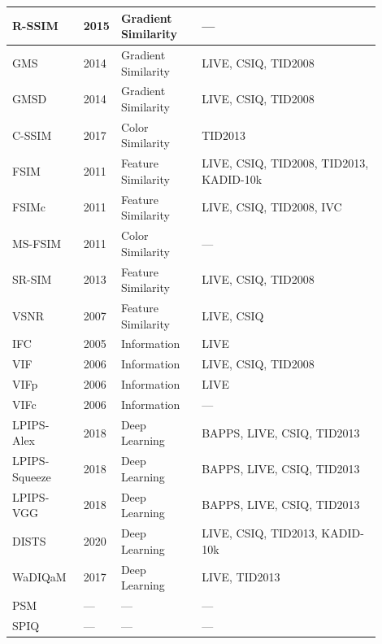 \begin{longtable}{
p{0.13\linewidth}  %
p{0.05\linewidth}  %
p{0.22\linewidth}  %
p{0.50\linewidth}  %
}
    R-SSIM~\cite{yan2015rssim} & 2015 & Gradient Similarity & --- \\ \hline
    GMS~\cite{xue2014gmsd} & 2014 & Gradient Similarity & LIVE, CSIQ, TID2008 \\ \hline
    GMSD~\cite{xue2014gmsd} & 2014 & Gradient Similarity & LIVE, CSIQ, TID2008 \\ \hline
    C-SSIM~\cite{hassan2017cssim} & 2017 & Color Similarity & TID2013 \\ \hline
    FSIM~\cite{zhang2011fsim} & 2011 & Feature Similarity & LIVE, CSIQ, TID2008, TID2013, KADID-10k \\ \hline
    FSIMc~\cite{zhang2011fsim} & 2011 & Feature Similarity & LIVE, CSIQ, TID2008, IVC \\ \hline
    MS-FSIM~\cite{zhang2011fsim} & 2011 & Color Similarity & --- \\ \hline
    SR-SIM~\cite{zhang2012srsim} & 2013 & Feature Similarity & LIVE, CSIQ, TID2008 \\ \hline
    VSNR~\cite{chandler2007vsnr} & 2007 & Feature Similarity & LIVE, CSIQ \\ \hline
    IFC~\cite{sheikh2005ifc} & 2005 & Information & LIVE \\ \hline
    VIF~\cite{sheikh2006vif} & 2006 & Information & LIVE, CSIQ, TID2008 \\ \hline
    VIFp~\cite{sheikh2006vif} & 2006 & Information & LIVE \\ \hline
    VIFc~\cite{sheikh2006vif} & 2006 & Information & --- \\ \hline
    LPIPS-Alex~\cite{zhang2018lpips} & 2018 & Deep Learning & BAPPS, LIVE, CSIQ, TID2013 \\ \hline
    LPIPS-Squeeze~\cite{zhang2018lpips} & 2018 & Deep Learning & BAPPS, LIVE, CSIQ, TID2013 \\ \hline
    LPIPS-VGG~\cite{zhang2018lpips} & 2018 & Deep Learning & BAPPS, LIVE, CSIQ, TID2013 \\ \hline
    DISTS~\cite{ding2020dists} & 2020 & Deep Learning & LIVE, CSIQ, TID2013, KADID-10k \\ \hline
    WaDIQaM~\cite{bosse2017wadiqam} & 2017 & Deep Learning & LIVE, TID2013 \\ \hline
    PSM & --- & --- & --- \\ \hline
    SPIQ & --- & --- & --- \\ \hline
\end{longtable}


